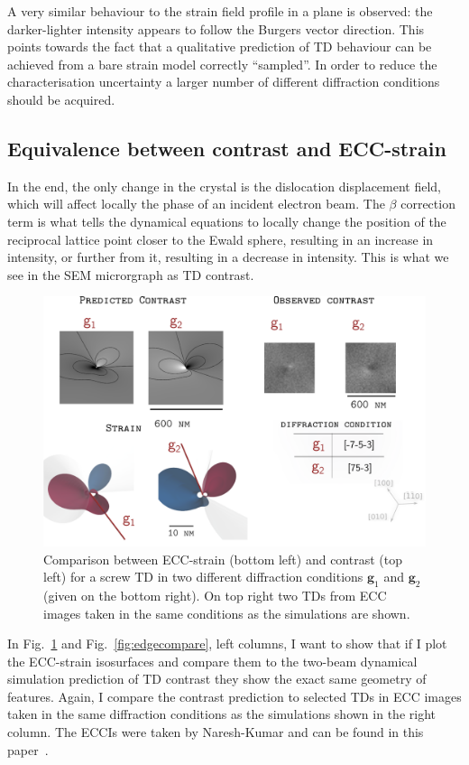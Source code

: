A very similar behaviour to the strain field profile in a plane is observed: the darker-lighter intensity appears to follow the Burgers vector direction. This points towards the fact that a qualitative prediction of TD behaviour can be achieved from a bare strain model correctly ``sampled''. In order to reduce the characterisation uncertainty a larger number of different diffraction conditions should be acquired.

\pagebreak
\subsection{Equivalence between contrast and ECC-strain}

In the end, the only change in the crystal is the dislocation displacement field, which will affect locally the phase of an incident electron beam. The $\beta$ correction term is what tells the dynamical equations to locally change the position of the reciprocal lattice point closer to the Ewald sphere, resulting in an increase in intensity, or further from it, resulting in a decrease in intensity. This is what we see in the SEM microrgraph as TD contrast. 

\begin{figure}[ht]
    \centering
    \includegraphics[width=0.7\linewidth]{Figures/screwcompare.png}
    \caption[ECC-strain vs contrast for a screw TD]{  Comparison between ECC-strain (bottom left) and contrast (top left) for a screw TD in two different diffraction conditions $\textbf{g}_1$ and $\textbf{g}_2$ (given on the bottom right). On top right two TDs from ECC images taken in the same conditions as the simulations are shown.}
    \label{fig:screwcompare}
\end{figure}


In Fig.~\ref{fig:screwcompare} and Fig.~\ref{fig:edgecompare}, left columns, I want to show that if I plot the ECC-strain isosurfaces and compare them to the two-beam dynamical simulation prediction of TD contrast they show the exact same geometry of features.  Again, I compare the contrast prediction to selected TDs in ECC images taken in the same diffraction conditions as the simulations shown in the right column.  The ECCIs were taken by Naresh-Kumar and can be found in this paper~\cite{Naresh}.

